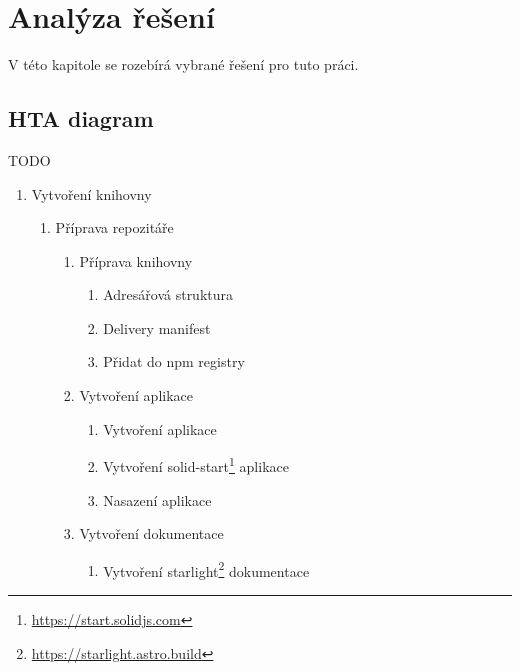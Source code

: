 \chapter{Analýza řešení}
\label{chap:analysis}

V této kapitole se rozebírá vybrané řešení pro tuto práci.

\section{HTA diagram}

TODO


\begin{enumerate}[label=\arabic*.]
    \item Vytvoření knihovny
          \begin{enumerate}[label*=\arabic*.]
              \item Příprava repozitáře
                    \begin{enumerate}[label*=\arabic*.]
                        \item Příprava knihovny
                              \begin{enumerate}[label*=\arabic*.]
                                  \item Adresářová struktura
                                  \item Delivery manifest
                                  \item Přidat do npm registry
                              \end{enumerate}
                        \item Vytvoření aplikace
                              \begin{enumerate}[label*=\arabic*.]
                                  \item Vytvoření aplikace
                                  \item Vytvoření solid-start\footnote{\url{https://start.solidjs.com}} aplikace
                                  \item Nasazení aplikace
                              \end{enumerate}
                        \item Vytvoření dokumentace
                              \begin{enumerate}[label*=\arabic*.]
                                  \item Vytvoření starlight\footnote{\url{https://starlight.astro.build}} dokumentace

\end{enumerate}
\end{enumerate}
\end{enumerate}
\end{enumerate}
